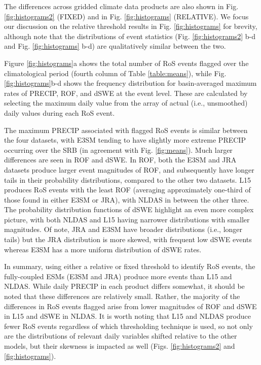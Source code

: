 \documentclass[nhess, manuscript]{copernicus}
\begin{document}
The differences across gridded climate data products are also shown in Fig. \ref{fig:histograms2} (FIXED) and in Fig. \ref{fig:histograms} (RELATIVE). We focus our discussion on the relative threshold results in Fig. \ref{fig:histograms} for brevity, although note that the distributions of event statistics (Fig. \ref{fig:histograms2} b-d and Fig. \ref{fig:histograms} b-d) are qualitatively similar between the two.

Figure \ref{fig:histograms}a shows the total number of RoS events flagged over the climatological period (fourth column of Table \ref{table:means}), while Fig. \ref{fig:histograms}b-d shows the frequency distribution for basin-averaged maximum rates of PRECIP, ROF, and dSWE at the event level. These are calculated by selecting the maximum daily value from the array of actual (i.e., unsmoothed) daily values during each RoS event.

The maximum PRECIP associated with flagged RoS events is similar between the four datasets, with E3SM tending to have slightly more extreme PRECIP occurring over the SRB (in agreement with Fig. \ref{fig:means}).
Much larger differences are seen in ROF and dSWE.
In ROF, both the E3SM and JRA datasets produce larger event magnitudes of ROF, and subsequently have longer tails in their probability distributions, compared to the other two datasets.
L15 produces RoS events with the least ROF (averaging approximately one-third of those found in either E3SM or JRA), with NLDAS in between the other three.
The probability distribution functions of dSWE highlight an even more complex picture, with both NLDAS and L15 having narrower distributions with smaller magnitudes.
Of note, JRA and E3SM have broader distributions (i.e., longer tails) but the JRA distribution is more skewed, with frequent low dSWE events whereas E3SM has a more uniform distribution of dSWE rates.

In summary, using either a relative or fixed threshold to identify RoS events, the fully-coupled ESMs (E3SM and JRA) produce more events than L15 and NLDAS.
While daily PRECIP in each product differs somewhat, it should be noted that these differences are relatively small.
Rather, the majority of the differences in RoS events flagged arise from lower magnitudes of ROF and dSWE in L15 and dSWE in NLDAS.
It is worth noting that L15 and NLDAS produce fewer RoS events regardless of which thresholding technique is used, so not only are the distributions of relevant daily variables shifted relative to the other models, but their skewness is impacted as well (Figs. \ref{fig:histograms2} and \ref{fig:histograms}).
\end{document}
